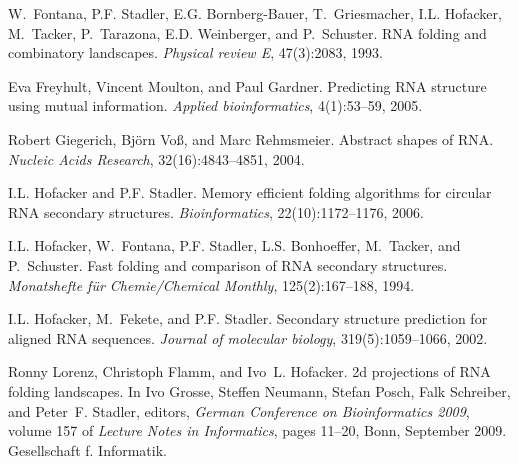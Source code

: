 \begin{DoxyDescription}
\item[\label{citelist_CITEREF_fontana:1993b}%
\Hypertarget{citelist_CITEREF_fontana:1993b}%
\mbox{[}8\mbox{]}]W.~Fontana, P.\+F. Stadler, E.\+G. Bornberg-\/\+Bauer, T.~Griesmacher, I.\+L. Hofacker, M.~Tacker, P.~Tarazona, E.\+D. Weinberger, and P.~Schuster. RNA folding and combinatory landscapes. {\itshape Physical review E}, 47(3)\+:2083, 1993.


\item[\label{citelist_CITEREF_freyhult:2005}%
\Hypertarget{citelist_CITEREF_freyhult:2005}%
\mbox{[}9\mbox{]}]Eva Freyhult, Vincent Moulton, and Paul Gardner. Predicting RNA structure using mutual information. {\itshape Applied bioinformatics}, 4(1)\+:53--59, 2005.


\item[\label{citelist_CITEREF_giegerich:2004}%
\Hypertarget{citelist_CITEREF_giegerich:2004}%
\mbox{[}10\mbox{]}]Robert Giegerich, Bj\"{o}rn Vo{\ss}, and Marc Rehmsmeier. Abstract shapes of RNA. {\itshape Nucleic Acids Research}, 32(16)\+:4843--4851, 2004.


\item[\label{citelist_CITEREF_hofacker:2006}%
\Hypertarget{citelist_CITEREF_hofacker:2006}%
\mbox{[}11\mbox{]}]I.\+L. Hofacker and P.\+F. Stadler. Memory efficient folding algorithms for circular RNA secondary structures. {\itshape Bioinformatics}, 22(10)\+:1172--1176, 2006.


\item[\label{citelist_CITEREF_hofacker:1994}%
\Hypertarget{citelist_CITEREF_hofacker:1994}%
\mbox{[}12\mbox{]}]I.\+L. Hofacker, W.~Fontana, P.\+F. Stadler, L.\+S. Bonhoeffer, M.~Tacker, and P.~Schuster. Fast folding and comparison of RNA secondary structures. {\itshape Monatshefte f\"{u}r Chemie/\+Chemical Monthly}, 125(2)\+:167--188, 1994.


\item[\label{citelist_CITEREF_hofacker:2002}%
\Hypertarget{citelist_CITEREF_hofacker:2002}%
\mbox{[}13\mbox{]}]I.\+L. Hofacker, M.~Fekete, and P.\+F. Stadler. Secondary structure prediction for aligned RNA sequences. {\itshape Journal of molecular biology}, 319(5)\+:1059--1066, 2002.


\item[\label{citelist_CITEREF_lorenz:2009}%
\Hypertarget{citelist_CITEREF_lorenz:2009}%
\mbox{[}14\mbox{]}]Ronny Lorenz, Christoph Flamm, and Ivo~L. Hofacker. 2d projections of RNA folding landscapes. In Ivo Grosse, Steffen Neumann, Stefan Posch, Falk Schreiber, and Peter~F. Stadler, editors, {\itshape German Conference on Bioinformatics 2009}, volume 157 of {\itshape Lecture Notes in Informatics}, pages 11--20, Bonn, September 2009. Gesellschaft f. Informatik.



\end{DoxyDescription}
